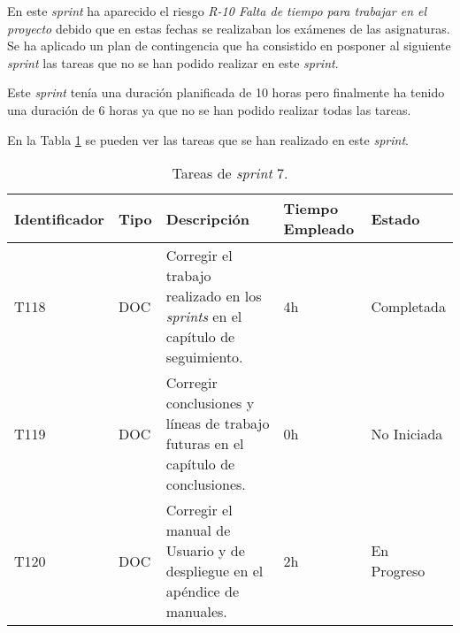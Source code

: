 En este \textit{sprint} ha aparecido el riesgo \textit{R-10 Falta de tiempo para trabajar en el proyecto} debido que en estas fechas se realizaban los exámenes de las asignaturas. Se ha aplicado un plan de contingencia que ha consistido en posponer al siguiente \textit{sprint} las tareas que no se han podido realizar en este \textit{sprint}.

Este \textit{sprint} tenía una duración planificada de 10 horas pero finalmente ha tenido una duración de 6 horas ya que no se han podido realizar todas las tareas.

En la Tabla \ref{table:sprint7}  se pueden ver las tareas que se han realizado en este \textit{sprint}.
\begin{table}[]
  \centering
\begin{tabular}{
  |p{}%
  |p{}%
  |p{}
  |p{}
  |p{}
  |%
  }
  \hline
  \textbf{Identificador} & \textbf{Tipo} & \textbf{Descripción}                                             & \textbf{Tiempo Empleado} & \textbf{Estado} \\ \hline

  T118                   & DOC           & Corregir el trabajo realizado en los \textit{sprints} en el capítulo de seguimiento.            & 4h                       & Completada      \\ \hline

  T119                   & DOC           & Corregir conclusiones y líneas de trabajo futuras en el capítulo de conclusiones.           & 0h                       & No Iniciada     \\ \hline

  T120                   & DOC           & Corregir el manual de Usuario y de despliegue en el apéndice de manuales.        & 2h                       & En Progreso      \\ \hline
 

 
\end{tabular}
\caption{Tareas de \textit{sprint} 7.}
\label{table:sprint7}
\end{table}



















